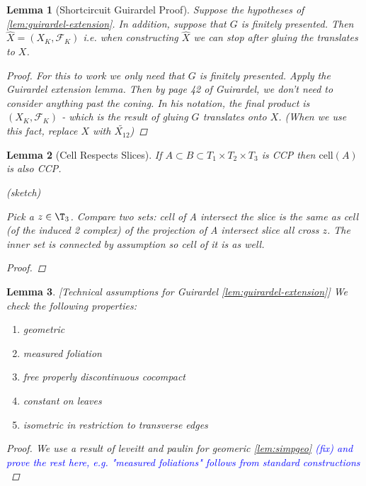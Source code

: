\documentclass{article}
\newcommand{\fix}[1]{\textcolor{blue}{(fix) #1}}
\theoremstyle{mystyle}
\newtheorem{lem}{Lemma}[section]
\theoremstyle{remark}
\begin{document}
\begin{lem}
    [Shortcircuit Guirardel Proof]
    \label{lem:shortcircuit} Suppose the hypotheses of \ref{lem:guirardel-extension}. In addition, suppose that $G$ is finitely presented. Then $\widehat X = (X_K, \mathscr{F}_K)$ i.e. when constructing $\widehat X$ we can stop after gluing the translates to $X$.
    \begin{proof}
        
        For this to work we only need that $G$ is finitely presented. Apply the Guirardel extension lemma. Then by page 42 of Guirardel, we don't need to consider anything past the coning. In his notation, the final product is $(X_K, \mathscr{F}_K)$ - which is the result of gluing $G$ translates onto $X$. (When we use this fact, replace $X$ with $\widetilde{X_{12}}$)
    \end{proof}
\end{lem}
\begin{lem}
    [Cell Respects Slices]
    If $A\subset B\subset T_1\times T_2\times T_3$ is CCP then $\text{cell}(A)$ is also CCP.
    \label{lem:cellrespecslice} 
    
    (sketch)
        
        Pick a $z \in \T_3$. Compare two sets: cell of A intersect the slice is the same as cell (of the induced 2 complex) of the projection of A intersect slice all cross $z$. The inner set is connected by assumption so cell of it is as well.
    
    \begin{proof}
    
    \end{proof}
\end{lem}
\begin{lem}
    \label{lem:technicalconditions}
    [Technical assumptions for Guirardel \ref{lem:guirardel-extension}] We check the following properties:
    \begin{enumerate}
        \item geometric
        \item measured foliation
        \item free properly discontinuous cocompact
        \item constant on leaves
        \item isometric in restriction to transverse edges
    \end{enumerate}
    \label{lem:measuredetc} 
    
    \begin{proof}
    We use a result of leveitt and paulin for geomeric \ref{lem:simpgeo}
       \fix{
          and prove the rest here, e.g. "measured foliations" follows from standard constructions
    } 
    \end{proof}
    

\end{lem}
\end{document}

